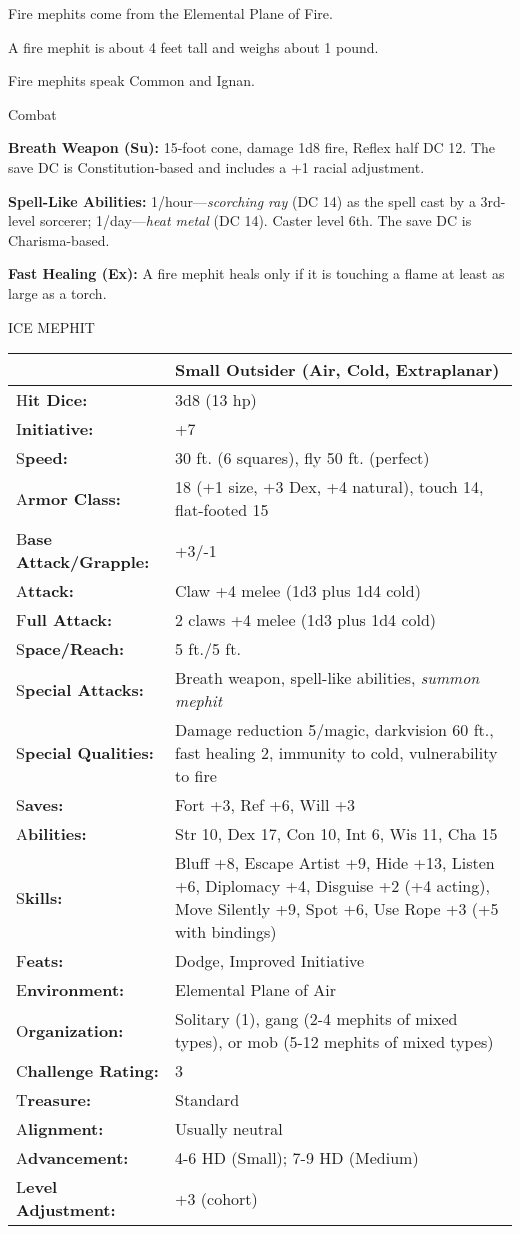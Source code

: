 \documentclass{article}
\begin{document}
Fire mephits come from the Elemental Plane of Fire.

A fire mephit is about 4 feet tall and weighs about 1 pound.

Fire mephits speak Common and Ignan.

Combat

\textbf{Breath Weapon (Su): }15-foot cone, damage 1d8 fire, Reflex half DC 12. 
The save DC is Constitution-based and includes a +1 racial adjustment.

\textbf{Spell-Like Abilities:} 1/hour---\textit{scorching ray }(DC 14) as the spell 
cast by a 3rd-level sorcerer; 1/day---\textit{heat metal }(DC 14). Caster level 
6th. The save DC is Charisma-based.

\textbf{Fast Healing (Ex):} A fire mephit heals only if it is touching a flame 
at least as large as a torch.

\vspace{12pt}
ICE MEPHIT

\begin{tabular}{|>{\raggedright}p{91pt}|>{\raggedright}p{230pt}|}
\hline
  & Small Outsider (Air, Cold, Extraplanar)\tabularnewline
\hline
H\textbf{it Dice:} & 3d8 (13 hp)\tabularnewline
\hline
I\textbf{nitiative:} & +7\tabularnewline
\hline
S\textbf{peed:} & 30 ft. (6 squares), fly 50 ft. (perfect)\tabularnewline
\hline
A\textbf{rmor Class:} & 18 (+1 size, +3 Dex, +4 natural), touch 14, flat-footed 
15\tabularnewline
\hline
B\textbf{ase Attack/Grapple:} & +3/-1\tabularnewline
\hline
A\textbf{ttack:} & Claw +4 melee (1d3 plus 1d4 cold)\tabularnewline
\hline
F\textbf{ull Attack:} & 2 claws +4 melee (1d3 plus 1d4 cold)\tabularnewline
\hline
S\textbf{pace/Reach:} & 5 ft./5 ft.\tabularnewline
\hline
S\textbf{pecial Attacks:} & Breath weapon, spell-like abilities, \textit{summon 
mephit}\tabularnewline
\hline
S\textbf{pecial Qualities:} & Damage reduction 5/magic, darkvision 60 ft., fast 
healing 2, immunity to cold, vulnerability to fire\tabularnewline
\hline
S\textbf{aves:} & Fort +3, Ref +6, Will +3\tabularnewline
\hline
A\textbf{bilities:} & Str 10, Dex 17, Con 10, Int 6, Wis 11, Cha 15\tabularnewline
\hline
S\textbf{kills:} & Bluff +8, Escape Artist +9, Hide +13, Listen +6, Diplomacy +4, 
Disguise +2 (+4 acting), Move Silently +9, Spot +6, Use Rope +3 (+5 with bindings)\tabularnewline
\hline
F\textbf{eats:} & Dodge, Improved Initiative\tabularnewline
\hline
E\textbf{nvironment:} & Elemental Plane of Air\tabularnewline
\hline
O\textbf{rganization:} & Solitary (1), gang (2-4 mephits of mixed types), or mob 
(5-12 mephits of mixed types)\tabularnewline
\hline
C\textbf{hallenge Rating:} & 3\tabularnewline
\hline
T\textbf{reasure:} & Standard\tabularnewline
\hline
A\textbf{lignment:} & Usually neutral\tabularnewline
\hline
A\textbf{dvancement:} & 4-6 HD (Small); 7-9 HD (Medium)\tabularnewline
\hline
L\textbf{evel Adjustment:} & +3 (cohort)\tabularnewline
\hline
\end{tabular}
\end{document}
